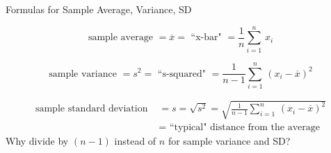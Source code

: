 \documentclass{beamer}\usepackage[]{graphicx}\usepackage[]{color}
\begin{document}
\begin{frame}[fragile]{Formulas for Sample Average, Variance, SD\;\;}
\vspace{0.25cm}

$$\mbox{sample average } = \overline{x} = \mbox{ ``x-bar" }
= \frac{1}{n} \sum_{i=1}^n\, x_i$$

$$\mbox{sample variance } = s^2 = \mbox{ ``s-squared" }
= \frac{1}{n-1} \sum_{i=1}^n\, (x_i-\overline{x})^2$$

\begin{align*}
\mbox{sample standard deviation } &= s
= \sqrt{s^2} = \sqrt{\frac{1}{n-1} \sum_{i=1}^n\, (x_i-\overline{x})^2}\\
&= \mbox{ ``typical" distance from the average}
\end{align*}
\vskip0.1cm
Why divide by $(n-1)$ instead of $n$ for sample variance and SD?

\end{frame}
\end{document}
